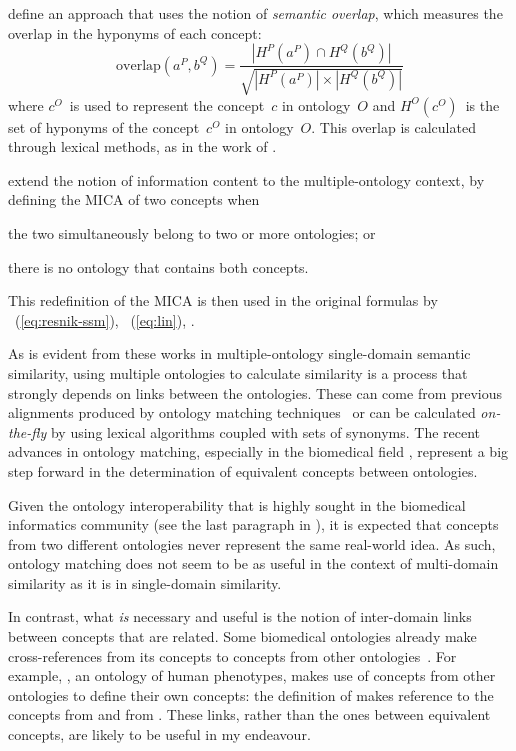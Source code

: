 \citet{Sanchez2012c} define an approach that uses the notion of \emph{semantic overlap}, which measures the overlap in the hyponyms of each concept:
\begin{equation}
\mathrm{overlap}(a^P,b^Q) =
\frac{|H^P(a^P)\cap H^Q(b^Q)|}
         {\sqrt{|H^P(a^P)|\times|H^Q(b^Q)|}}
\label{eq:sanchez-hyponyms}
\end{equation}
where $c^O$~is used to represent the concept~$c$ in ontology~$O$ and $H^O(c^O)$~is the set of hyponyms of the concept~$c^O$ in ontology~$O$. This overlap is calculated through lexical methods, as in the work of \citet{Rodriguez2003}.

\citet{Sanchez2013} extend the notion of information content to the multiple-ontology context, by defining the MICA of two concepts when
\begin{paralist}
    \item the two simultaneously belong to two or more ontologies; or
    \item there is no ontology that contains both concepts.
\end{paralist}
This redefinition of the MICA is then used in the original formulas by \citet{Resnik1995}~(\eqref{eq:resnik-ssm}), \citet{Lin1998}~(\eqref{eq:lin}), \etc.

As is evident from these works in multiple-ontology single-domain semantic similarity, using multiple ontologies to calculate similarity is a process that strongly depends on links between the ontologies. These can come from previous alignments produced by ontology matching techniques~\citep{Euzenat2007} or can be calculated \emph{on-the-fly} by using lexical algorithms coupled with sets of synonyms. The recent advances in ontology matching, especially in the biomedical field \citep[\eg][]{Cruz2009a,Gross2012}, represent a big step forward in the determination of equivalent concepts between ontologies.

Given the ontology interoperability that is highly sought in the biomedical informatics community (see the last paragraph in ), it is expected that concepts from two different ontologies never represent the same real-world idea. As such, ontology matching does not seem to be as useful in the context of multi-domain similarity as it is in single-domain similarity.

In contrast, what \emph{is} necessary and useful is the notion of inter-domain links between concepts that are related. Some biomedical ontologies already make cross-references from its concepts to concepts from other ontologies~\citep{Kamdar2015}. For example, , an ontology of human phenotypes, makes use of concepts from other ontologies to define their own concepts: \eg the definition of  makes reference to the concepts  from  and  from . These links, rather than the ones between equivalent concepts, are likely to be useful in my endeavour.


